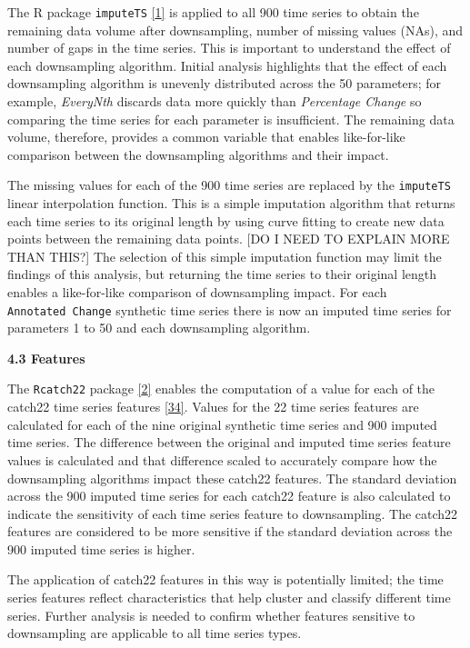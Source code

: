 \documentclass{article}
\begin{document}
The R package \texttt{imputeTS}
\protect\hyperlink{ref-imputeTS_R}{{[}1{]}} is applied to all 900 time
series to obtain the remaining data volume after downsampling, number of
missing values (NAs), and number of gaps in the time series. This is
important to understand the effect of each downsampling algorithm.
Initial analysis highlights that the effect of each downsampling
algorithm is unevenly distributed across the 50 parameters; for example,
\emph{EveryNth} discards data more quickly than \emph{Percentage Change}
so comparing the time series for each parameter is insufficient. The
remaining data volume, therefore, provides a common variable that
enables like-for-like comparison between the downsampling algorithms and
their impact.

The missing values for each of the 900 time series are replaced by the
\texttt{imputeTS} linear interpolation function. This is a simple
imputation algorithm that returns each time series to its original
length by using curve fitting to create new data points between the
remaining data points. {[}DO I NEED TO EXPLAIN MORE THAN THIS?{]} The
selection of this simple imputation function may limit the findings of
this analysis, but returning the time series to their original length
enables a like-for-like comparison of downsampling impact. For each
\texttt{Annotated\ Change} synthetic time series there is now an imputed
time series for parameters 1 to 50 and each downsampling algorithm.

\textbf{4.3 Features}

The \texttt{Rcatch22} package \protect\hyperlink{ref-catch22_R}{{[}2{]}}
enables the computation of a value for each of the catch22 time series
features \protect\hyperlink{ref-catch22}{{[}34{]}}. Values for the 22
time series features are calculated for each of the nine original
synthetic time series and 900 imputed time series. The difference
between the original and imputed time series feature values is
calculated and that difference scaled to accurately compare how the
downsampling algorithms impact these catch22 features. The standard
deviation across the 900 imputed time series for each catch22 feature is
also calculated to indicate the sensitivity of each time series feature
to downsampling. The catch22 features are considered to be more
sensitive if the standard deviation across the 900 imputed time series
is higher.

The application of catch22 features in this way is potentially limited;
the time series features reflect characteristics that help cluster and
classify different time series. Further analysis is needed to confirm
whether features sensitive to downsampling are applicable to all time
series types.
\end{document}

